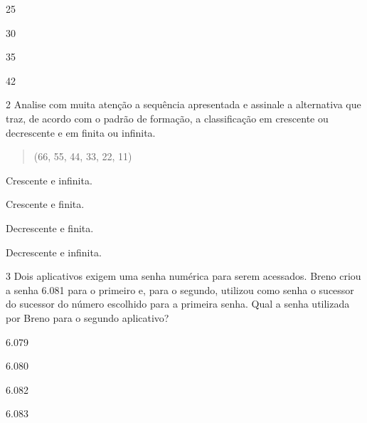 \begin{minipage}{.5\textwidth}
\begin{escolha}
\item
  25
\item
  30
\item
  35
\item
  42
\end{escolha}
\end{minipage}

\pagebreak

\num{2} Analise com muita atenção a sequência apresentada e assinale a
alternativa que traz, de acordo com o padrão de formação, a classificação em crescente ou decrescente e
em finita ou infinita.

\begin{quote}
(66, 55, 44, 33, 22, 11)
\end{quote}

\begin{minipage}{.5\textwidth}
\begin{escolha}
\item
  Crescente e infinita.
\item
  Crescente e finita.
\item
  Decrescente e finita.
\item
  Decrescente e infinita.
\end{escolha}
\end{minipage}
\bigskip

\num{3} Dois aplicativos exigem uma senha numérica para serem acessados.
Breno
criou a senha 6.081 para o primeiro e, para o segundo, utilizou como senha
o sucessor do sucessor do número escolhido para a primeira senha. Qual a
senha utilizada por Breno para o segundo aplicativo?

\begin{minipage}{.5\textwidth}
\begin{escolha}
\item
  6.079
\item
  6.080
\item
  6.082
\item
  6.083
\end{escolha}
\end{minipage}

